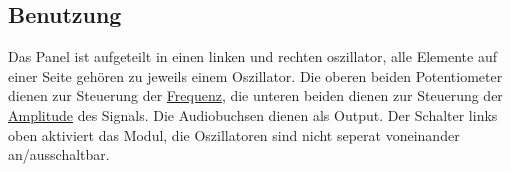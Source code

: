 \subsection{Benutzung}
\label{sec:org275fd08}
Das Panel ist aufgeteilt in einen linken und rechten oszillator, alle Elemente auf einer Seite gehören zu jeweils einem Oszillator. Die oberen beiden Potentiometer dienen zur Steuerung der \href{file:///home/felixp/Documents/diplomarbeit/dokumentation/content/theoretische\_grundlagen.org}{Frequenz}, die unteren beiden dienen zur Steuerung der \href{file:///home/felixp/Documents/diplomarbeit/dokumentation/content/theoretische\_grundlagen.org}{Amplitude} des Signals. Die Audiobuchsen dienen als Output. Der Schalter links oben aktiviert das Modul, die Oszillatoren sind nicht seperat voneinander an/ausschaltbar.
